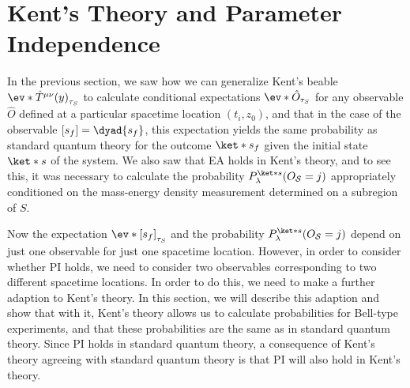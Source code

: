 \documentclass[12pt]{report}
\begin{document}




\section{Kent's Theory and Parameter Independence\label{kentpi}}
  In the previous section, we saw how we can generalize Kent's beable $\ev*{\hat{T}^{\mu\nu}(y)}_{\tau_S}$ to calculate conditional expectations $\ev*{\hat{O}}_{\tau_S}$ for any observable $\hat{O}$ defined at a particular spacetime location $(t_i, z_0)$, and that in the case of the observable $[s_f]=\dyad{s_f}$, this expectation yields the same probability as standard quantum theory for the outcome $\ket*{s_f}$ given the initial state $\ket*{s}$ of the system.  We also saw that  EA holds in Kent's theory, and to see this, it was necessary to calculate the probability $P_\lambda^{\ket*{s}}(O_{\mathcal{S}}=j)$ appropriately conditioned on the mass-energy density measurement determined on a subregion of $S$. 
  
  Now the expectation  $\ev*{[s_f]}_{\tau_S}$ and the probability $P_\lambda^{\ket*{s}}(O_{\mathcal{S}}=j)$ depend on just one observable for just one spacetime location. However, in order to consider whether PI holds, we need to consider two observables corresponding to two different spacetime locations. In order to do this, we need to make a further adaption to Kent's theory. In this section, we will describe this adaption and show that with it, Kent's theory allows us to calculate probabilities for Bell-type experiments, and that these probabilities are the same as in standard quantum theory. Since PI holds in standard quantum theory,  a consequence of Kent's theory agreeing with standard quantum theory is that PI will also hold in Kent's theory. 
\end{document}
